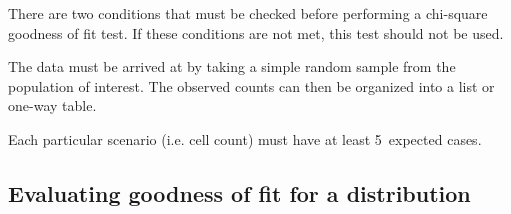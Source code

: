 \begin{tipBox}{
There are two conditions that must be checked before performing a chi-square goodness of fit test. If these conditions are not met, this test should not be used.\vspace{-1mm}
\begin{description}
\setlength{\itemsep}{0mm}
\item[Simple random sample.] The data must be arrived at by taking a simple random sample from the population of interest. The observed counts can then be organized into a list or one-way table.
\item[All Expected Counts at least 5] Each particular scenario (i.e. cell count) must have at least 5~expected cases.
\vspace{1mm}
\end{description}
}
\end{tipBox}



\subsection{Evaluating goodness of fit for a distribution}

